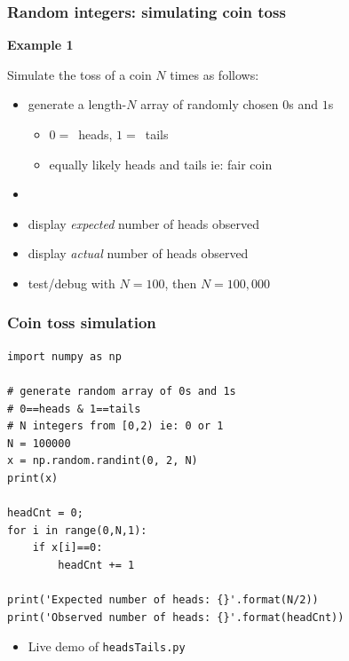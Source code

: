\documentclass[english,14pt]{beamer}
\begin{document}

\begin{frame}[fragile]

\frametitle{Random integers: simulating coin toss}

\textbf{Example 1}\\
\vspace*{5mm}

Simulate the toss of a coin $N$ times as follows:

\begin{itemize}
	\item generate a length-$N$ array of randomly chosen $0$s and $1$s
	\begin{itemize}
		\item $0 = $~heads, $1 = $~tails
		\item equally likely heads and tails ie: fair coin
	\end{itemize}
	\item[]
	\item display \emph{expected} number of heads observed
	\item display \emph{actual} number of heads observed
	\item test/debug with $N=100$, then $N=100,000$
\end{itemize}

\end{frame}


\begin{frame}[fragile]

\frametitle{Coin toss simulation}
\vspace*{-3mm}
\begin{lstlisting}[style=CStyle]
import numpy as np

# generate random array of 0s and 1s
# 0==heads & 1==tails
# N integers from [0,2) ie: 0 or 1
N = 100000
x = np.random.randint(0, 2, N)
print(x)

headCnt = 0;
for i in range(0,N,1):
    if x[i]==0:
        headCnt += 1

print('Expected number of heads: {}'.format(N/2))
print('Observed number of heads: {}'.format(headCnt))
\end{lstlisting}
\vspace*{-3mm}
\begin{itemize}
	\item Live demo of \texttt{headsTails.py}
\end{itemize}

\end{frame}
\end{document}
